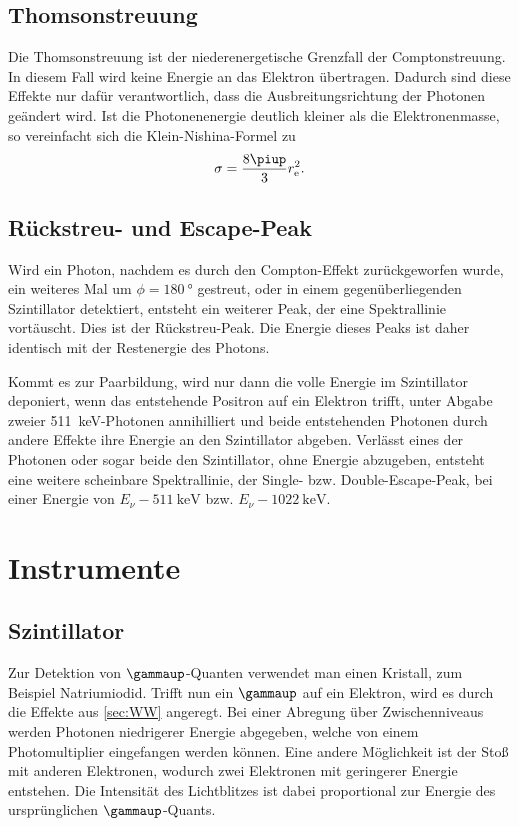 \documentclass[11pt, ngerman, fleqn, DIV=15, headinclude, BCOR=2cm]{scrreprt}
\begin{document}
\subsection{Thomsonstreuung}

Die Thomsonstreuung ist der niederenergetische Grenzfall der Comptonstreuung.
In diesem Fall wird keine Energie an das Elektron übertragen. Dadurch sind
diese Effekte nur dafür verantwortlich, dass die Ausbreitungsrichtung der
Photonen geändert wird. Ist die Photonenenergie deutlich kleiner als die
Elektronenmasse, so vereinfacht sich die Klein-Nishina-Formel zu
\parencite[(2.115)]{Leo/Techniques_Nuclear_Experiments}
\[
    \sigma = \frac{8\piup}3 r_\text e^2.
\]

\subsection{Rückstreu- und Escape-Peak}

Wird ein Photon, nachdem es durch den Compton-Effekt zurückgeworfen wurde, ein
weiteres Mal um $\phi = \SI{180}{\degree}$ gestreut, oder in einem
gegenüberliegenden Szintillator detektiert, entsteht ein weiterer Peak, der
eine Spektrallinie vortäuscht. Dies ist der Rückstreu-Peak. Die Energie dieses
Peaks ist daher identisch mit der Restenergie des Photons.

Kommt es zur Paarbildung, wird nur dann die volle Energie im Szintillator
deponiert, wenn das entstehende Positron auf ein Elektron trifft, unter Abgabe
zweier \SI{511}{\kilo\electronvolt}-Photonen annihilliert und beide
entstehenden Photonen durch andere Effekte ihre Energie an den Szintillator
abgeben. Verlässt eines der Photonen oder sogar beide den Szintillator, ohne
Energie abzugeben, entsteht eine weitere scheinbare Spektrallinie, der Single-
bzw. Double-Escape-Peak, bei einer Energie von
$E_\nu-\SI{511}{\kilo\electronvolt}$ bzw. $E_\nu-\SI{1022}{\kilo\electronvolt}$.



\section{Instrumente}

\subsection{Szintillator}

Zur Detektion von $\gammaup$-Quanten verwendet man einen Kristall, zum Beispiel
Natriumiodid. Trifft nun ein $\gammaup$ auf ein Elektron, wird es durch die
Effekte aus \ref{sec:WW} angeregt. Bei einer Abregung über Zwischenniveaus
werden Photonen niedrigerer Energie abgegeben, welche von einem
Photomultiplier eingefangen werden können. Eine andere Möglichkeit ist der
Stoß mit anderen Elektronen, wodurch zwei Elektronen mit geringerer Energie
entstehen. Die Intensität des Lichtblitzes ist dabei proportional zur Energie
des ursprünglichen $\gammaup$-Quants.
\end{document}
